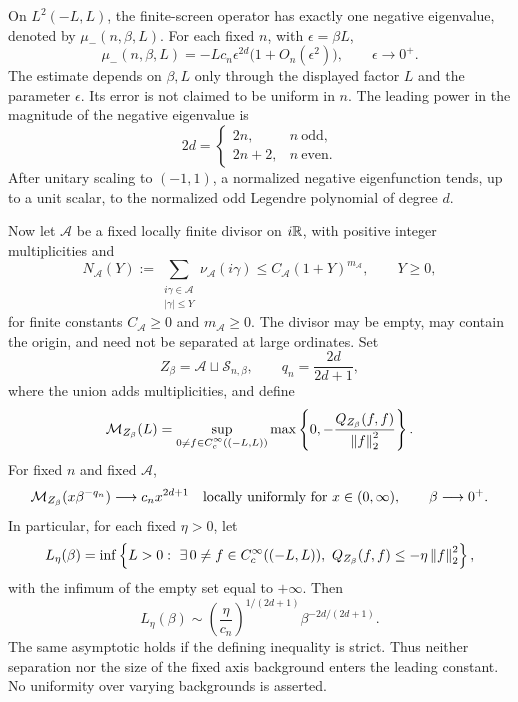 On \(L^2(-L,L)\), the finite-screen operator has exactly one
negative eigenvalue, denoted by \(\mu_-(n,\beta,L)\). For each fixed
\(n\), with \(\epsilon=\beta L\),
\begin{equation}\label{scr:eigenvalue}
 \mu_-(n,\beta,L)
   =-L c_n\epsilon^{2d}
                   \bigl(1+O_n(\epsilon^2)\bigr),
 \qquad \epsilon\longrightarrow0^+.
\end{equation}
The estimate depends on \(\beta,L\) only through the displayed factor
\(L\) and the parameter \(\epsilon\). Its error is not claimed to
be uniform in \(n\). The leading power in the magnitude of the
negative eigenvalue is
\[
 2d=
 \begin{cases}
  2n,&n\ \text{odd},\\
  2n+2,&n\ \text{even}.
 \end{cases}
\]
After unitary scaling to \((-1,1)\), a normalized negative
eigenfunction tends, up to a unit scalar, to the normalized odd
Legendre polynomial of degree \(d\).

Now let \(\mathcal A\) be a fixed locally finite divisor on
\(i\mathbb R\), with positive integer multiplicities and
\begin{equation}\label{scr:background-count}
 N_{\mathcal A}(Y):=
   \sum_{\substack{i\gamma\in\mathcal A\\|\gamma|\le Y}}
      \nu_{\mathcal A}(i\gamma)
 \le C_{\mathcal A}(1+Y)^{m_{\mathcal A}},
 \qquad Y\ge0,
\end{equation}
for finite constants \(C_{\mathcal A}\ge0\) and
\(m_{\mathcal A}\ge0\). The divisor may be empty, may contain the
origin, and need not be separated at large ordinates. Set
\[
 Z_\beta=\mathcal A\sqcup\mathcal S_{n,\beta},\qquad
 q_n=\frac{2d}{2d+1},
\]
where the union adds multiplicities, and define
\begin{equation}\label{scr:margin-definition}
 \mathcal M_{Z_\beta}(L)
 =\sup_{\substack{0\ne f\in C_c^\infty((-L,L))}}
       \max\left\{0,-\frac{Q_{Z_\beta}(f,f)}{\left\|f\right\|_2^2}\right\}.
\end{equation}
For fixed \(n\) and fixed \(\mathcal A\),
\begin{equation}\label{scr:transition}
 \mathcal M_{Z_\beta}(x\beta^{-q_n})
       \longrightarrow c_nx^{2d+1}
 \quad\text{locally uniformly for }x\in(0,\infty),
 \qquad \beta\longrightarrow0^+.
\end{equation}
In particular, for each fixed \(\eta>0\), let
\[
 L_\eta(\beta)
 =\inf\left\{L>0:\ \exists\,0\ne f\in C_c^\infty((-L,L)),
           \ Q_{Z_\beta}(f,f)\le-\eta\left\|f\right\|_2^2\right\},
\]
with the infimum of the empty set equal to \(+\infty\). Then
\begin{equation}\label{scr:first-radius}
 L_\eta(\beta)\sim
       \left(\frac{\eta}{c_n}\right)^{1/(2d+1)}
                     \beta^{-2d/(2d+1)}.
\end{equation}
The same asymptotic holds if the defining inequality is strict.
Thus neither separation nor the size of the fixed axis background
enters the leading constant. No uniformity over varying backgrounds
is asserted.


